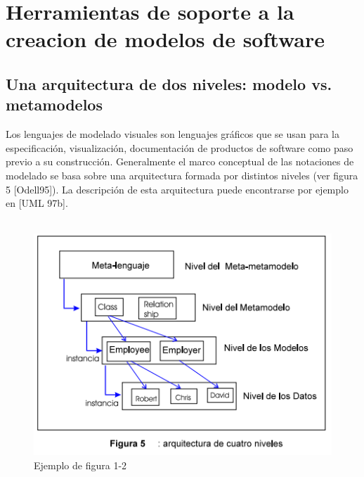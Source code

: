 \section{Herramientas de soporte a la creacion de modelos de software}

\begin{spacing}{4.0}
\end{spacing}
\subsection{Una arquitectura de dos niveles: modelo vs. metamodelos}
\begin{spacing}{2.0}
\end{spacing}
Los lenguajes de modelado visuales son lenguajes gráficos que se usan para la especificación,
visualización, documentación de productos de software como paso previo a su construcción.
Generalmente el marco conceptual de las notaciones de modelado se basa sobre una arquitectura
formada por distintos niveles (ver figura 5 [Odell95]). La descripción de esta arquitectura puede
encontrarse por ejemplo en [UML 97b].
\\\\
\begin{figure}[H]
\centering
\includegraphics[scale=0.5]{./Imagenes/modelo19}
\caption{Ejemplo de figura 1-2}
\label{figura1}
\end{figure}

